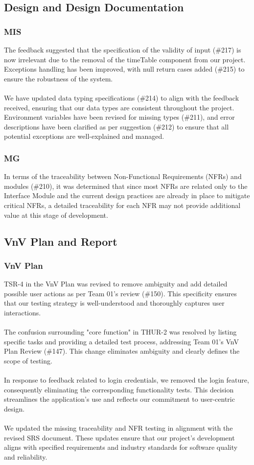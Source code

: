 \documentclass{article}
\begin{document}
\subsection{Design and Design Documentation}
\subsubsection{MIS}
The feedback suggested that the specification of the validity of input (\#217) is now irrelevant due to the removal of the timeTable component from our project. Exceptions handling has been improved, with null return cases added (\#215) to ensure the robustness of the system.\\
\\
We have updated data typing specifications (\#214) to align with the feedback received, ensuring that our data types are consistent throughout the project. Environment variables have been revised for missing types (\#211), and error descriptions have been clarified as per suggestion (\#212) to ensure that all potential exceptions are well-explained and managed.
\subsubsection{MG}
In terms of the traceability between Non-Functional Requirements (NFRs) and modules (\#210), it was determined that since most NFRs are related only to the Interface Module and the current design practices are already in place to mitigate critical NFRs, a detailed traceability for each NFR may not provide additional value at this stage of development.
\subsection{VnV Plan and Report}
\subsubsection{VnV Plan}
TSR-4 in the VnV Plan was revised to remove ambiguity and add detailed possible user actions as per Team 01's review (\#150). This specificity ensures that our testing strategy is well-understood and thoroughly captures user interactions.\\
\\
The confusion surrounding "core function" in THUR-2 was resolved by listing specific tasks and providing a detailed test process, addressing Team 01's VnV Plan Review (\#147). This change eliminates ambiguity and clearly defines the scope of testing.\\
\\
In response to feedback related to login credentials, we removed the login feature, consequently eliminating the corresponding functionality tests. This decision streamlines the application's use and reflects our commitment to user-centric design.\\
\\
We updated the missing traceability and NFR testing in alignment with the revised SRS document. These updates ensure that our project's development aligns with specified requirements and industry standards for software quality and reliability.
\end{document}

